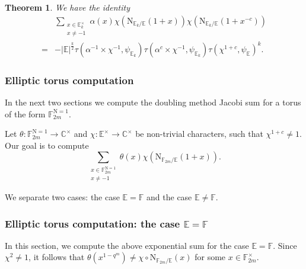 \documentclass[12pt, reqno]{amsart}
\newtheorem{theorem}{Theorem}[section]
\theoremstyle{definition}
\theoremstyle{definition}
\theoremstyle{definition}
\newcommand{\cComplex}{\mathbb{C}}
\newcommand{\multiplicativegroup}[1]{#1^{\times}}
\newcommand{\sizeof}[1]{\left|#1\right|}
\newcommand{\fieldCharacter}{\psi}
\newcommand{\involution}[1]{#1^{c}}
\newcommand{\minusInvolution}[1]{#1^{-c}}
\newcommand{\involutionPlusOne}[1]{#1^{1+c}}
\newcommand{\aFieldNorm}{\mathrm{N}}
\newcommand{\finiteField}{\mathbb{F}}
\newcommand{\quadraticExtension}{\mathbb{E}}
\newcommand{\finiteFieldExtension}[1]{\finiteField_{#1}}
\newcommand{\quadraticFieldExtension}[1]{\quadraticExtension_{#1}}
\newcommand{\NormOneGroup}[1]{\finiteFieldExtension{#1}^{\aFieldNorm = 1}}
\newcommand{\GaussSumCharacter}[3]{\tau\left(#1 \times #2, #3\right)}
\begin{document}
\begin{theorem}We have the identity
\begin{align*}
	& \sum_{\substack{x \in \multiplicativegroup{\quadraticFieldExtension{k}}\\
			x \ne -1}} \alpha \left(x\right) \chi\left(\aFieldNorm_{\quadraticFieldExtension{k} \slash \quadraticExtension}\left(1 + x\right)\right) \chi\left(\aFieldNorm_{\quadraticFieldExtension{k} \slash \quadraticExtension}\left(1 + \minusInvolution{x}\right)\right) \\
	=& -\sizeof{\quadraticExtension}^{\frac{k}{2}} \GaussSumCharacter{\alpha^{-1}}{\chi^{-1}}{\fieldCharacter_{\quadraticFieldExtension{k}}} \GaussSumCharacter{\involution{\alpha}}{\chi^{-1}}{\fieldCharacter_{\quadraticFieldExtension{k}}} \tau\left(\involutionPlusOne{\chi}, \fieldCharacter_{\quadraticExtension}\right)^k.
\end{align*}
\end{theorem}

\subsubsection{Elliptic torus computation}
In the next two sections we compute the doubling method Jacobi sum for a torus of the form $\NormOneGroup{2m}$.

Let $\theta \colon \NormOneGroup{2m} \to \multiplicativegroup{\cComplex}$ and $\chi \colon \multiplicativegroup{\quadraticExtension} \to \multiplicativegroup{\cComplex}$ be non-trivial characters, such that $\involutionPlusOne{\chi} \ne 1$. Our goal is to compute $$\sum_{\substack{x \in \NormOneGroup{2m}\\
		x \ne -1}} \theta \left(x\right) \chi\left(\aFieldNorm_{\finiteFieldExtension{2m} \slash \quadraticExtension}\left(1 + x\right)\right).$$

We separate two cases: the case $\quadraticExtension = \finiteField$ and the case $\quadraticExtension \ne \finiteField$.

\subsubsection{Elliptic torus computation: the case $\quadraticExtension = \finiteField$}
In this section, we compute the above exponential sum for the case $\quadraticExtension = \finiteField$. Since $\chi^2 \ne 1$, it follows that $\theta\left(x^{1-q^m}\right) \ne \chi \circ \aFieldNorm_{\finiteFieldExtension{2m} \slash \quadraticExtension}\left(x\right)$ for some $x \in \multiplicativegroup{\finiteFieldExtension{2m}}$.
\end{document}
